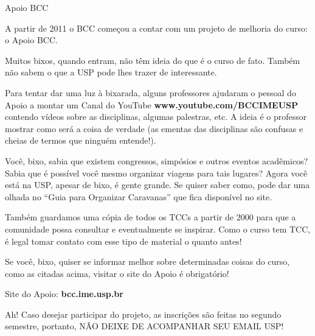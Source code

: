 \begin{subsubsecao}{Apoio BCC}

A partir de 2011 o BCC começou a contar com um projeto de melhoria do curso: o Apoio BCC.

Muitos bixos, quando entram, não têm ideia do que é o curso de fato. Também não 
sabem o que a USP pode lhes trazer de interessante.

Para tentar dar uma luz à bixarada, alguns professores ajudaram o pessoal do
Apoio a montar um Canal do YouTube {\bf www.youtube.com/BCCIMEUSP} contendo vídeos sobre as disciplinas, algumas palestras, etc. A ideia é o professor mostrar como será 
a coisa de verdade (as ementas das disciplinas são confusas e cheias de termos 
que ninguém entende!).

Você, bixo, sabia que existem congressos, simpósios e outros eventos acadêmicos? 
Sabia que é possível você mesmo organizar viagens para tais lugares? Agora você 
está na USP, apesar de bixo, é gente grande. Se quiser saber como, pode dar uma 
olhada no ``Guia para Organizar Caravanas'' que fica disponível no site.

Também guardamos uma cópia de todos os TCCs a partir de 2000 para que a 
comunidade possa consultar e eventualmente se inspirar. Como o curso tem TCC, é 
legal tomar contato com esse tipo de material o quanto antes!

Se você, bixo, quiser se informar melhor sobre determinadas coisas do curso, 
como as citadas acima, visitar o site do Apoio é obrigatório!

Site do Apoio: {\bf bcc.ime.usp.br}

Ah! Caso desejar participar do projeto, as inscrições são feitas no segundo 
semestre, portanto, NÃO DEIXE DE ACOMPANHAR SEU EMAIL USP!
\end{subsubsecao}
